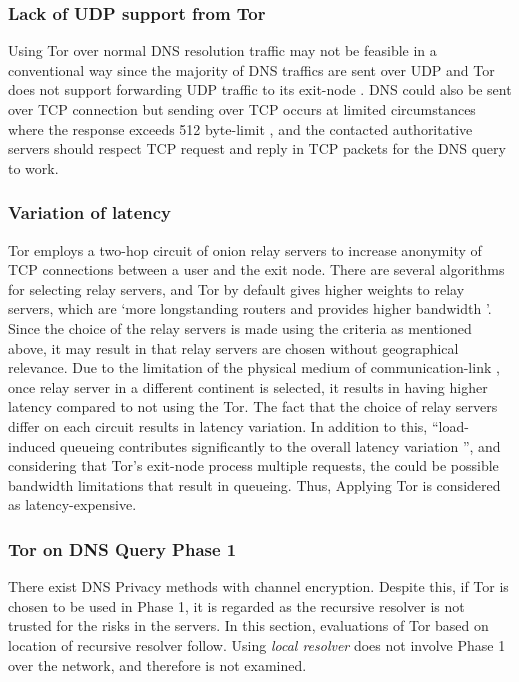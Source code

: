 \subsubsection{Lack of UDP support from Tor}\label{no-udp-tor}
Using Tor over normal DNS resolution traffic may not be feasible in a conventional way since the majority of DNS traffics are sent over UDP and Tor does not support forwarding UDP traffic to its exit-node \cite{udp-over-tor, dingledine2004tor}.
DNS could also be sent over TCP connection but sending over TCP occurs at limited circumstances where the response exceeds 512 byte-limit \cite{rfc7766}, and the contacted authoritative servers should respect TCP request and reply in TCP packets for the DNS query to work.

\subsubsection{Variation of latency}
Tor employs a two-hop circuit of onion relay servers to increase anonymity of TCP connections between a user and the exit node.
There are several algorithms for selecting relay servers, and Tor by default gives higher weights to relay servers, which are `more longstanding routers and provides higher bandwidth \cite{wacek2013empirical}'.
Since the choice of the relay servers is made using the criteria as mentioned above, it may result in that relay servers are chosen without geographical relevance.
Due to the limitation of the physical medium of communication-link \cite{Singla:2014:ISL}, once relay server in a different continent is selected, it results in having higher latency compared to not using the Tor.
The fact that the choice of relay servers differ on each circuit results in latency variation. In addition to this, ``load-induced queueing contributes significantly to the overall latency variation \cite{Hoiland-Jorgensen:2016}'', and considering that Tor's exit-node process multiple requests, the could be possible bandwidth limitations that result in queueing.
Thus, Applying Tor is considered as latency-expensive.

\subsubsection{Tor on DNS Query Phase 1}
There exist DNS Privacy methods with channel encryption. Despite this, if Tor is chosen to be used in Phase 1, it is regarded as the recursive resolver is not trusted for the risks in the servers.
In this section, evaluations of Tor based on location of recursive resolver follow. Using \textit{local resolver} does not involve Phase 1 over the network, and therefore is not examined.

